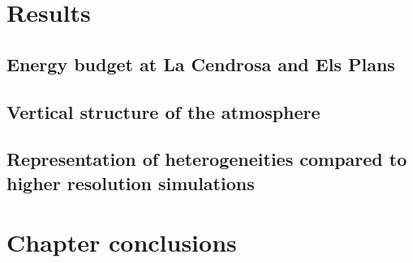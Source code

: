 
\section{Results}
\subsection{Energy budget at La Cendrosa and Els Plans}
\subsection{Vertical structure of the atmosphere}
\subsection{Representation of heterogeneities compared to higher resolution simulations}

\section{Chapter conclusions}